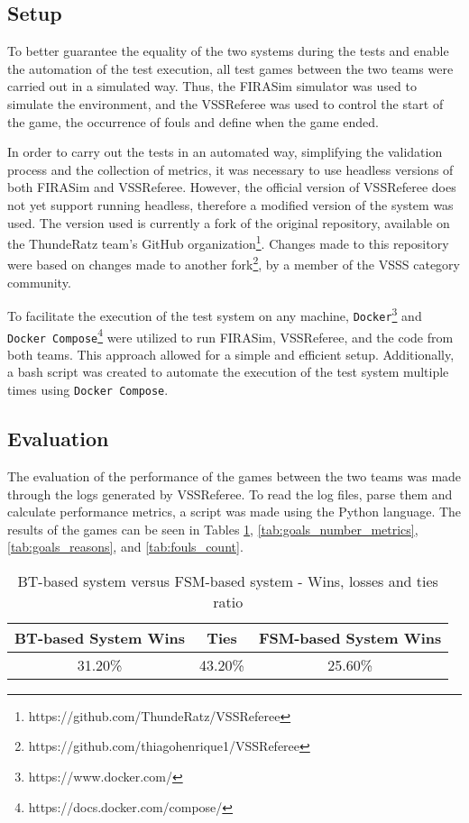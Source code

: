 \subsection{Setup}

To better guarantee the equality of the two systems during the tests and enable the automation of the test execution, all test games between the two teams were carried out in a simulated way. Thus, the FIRASim simulator \cite{FIRASim} was used to simulate the environment, and the VSSReferee \cite{VSSReferee} was used to control the start of the game, the occurrence of fouls and define when the game ended.

In order to carry out the tests in an automated way, simplifying the validation process and the collection of metrics, it was necessary to use headless versions of both FIRASim and VSSReferee. However, the official version of VSSReferee does not yet support running headless, therefore a modified version of the system was used. The version used is currently a fork of the original repository, available on the ThundeRatz team's GitHub organization\footnote{https://github.com/ThundeRatz/VSSReferee}. Changes made to this repository were based on changes made to another fork\footnote{https://github.com/thiagohenrique1/VSSReferee}, by a member of the VSSS category community.

To facilitate the execution of the test system on any machine, \texttt{Docker}\footnote{https://www.docker.com/} and \texttt{Docker Compose}\footnote{https://docs.docker.com/compose/} were utilized to run FIRASim, VSSReferee, and the code from both teams. This approach allowed for a simple and efficient setup. Additionally, a bash script was created to automate the execution of the test system multiple times using \texttt{Docker Compose}.

\subsection{Evaluation}

The evaluation of the performance of the games between the two teams was made through the logs generated by VSSReferee. To read the log files, parse them and calculate performance metrics, a script was made using the Python language. The results of the games can be seen in Tables \ref{tab:wins}, \ref{tab:goals_number_metrics}, \ref{tab:goals_reasons}, and \ref{tab:fouls_count}.

\begin{table}[h]
    \centering
    \begin{tabular}{c c c}
        \toprule
        BT-based System Wins & Ties    & FSM-based System Wins \\
        \midrule
        31.20\%              & 43.20\% & 25.60\%  \\
        \bottomrule
    \end{tabular}
    \caption{BT-based system versus FSM-based system - Wins, losses and ties ratio}
    \label{tab:wins}
\end{table}

